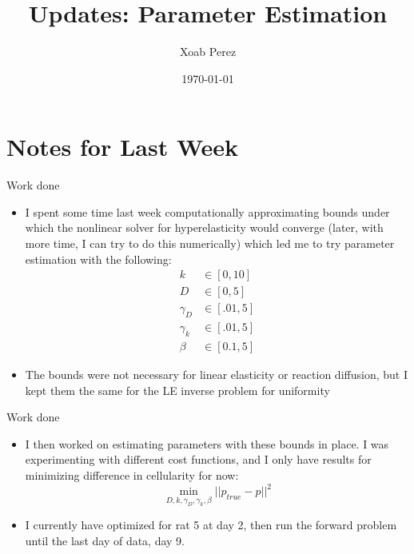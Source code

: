 \documentclass{beamer}
\title[Updates]{Updates: Parameter Estimation}
\author{Xoab Perez}
\date{\today}
\begin{document}
\begin{frame}
  \titlepage
\end{frame}


\section{Notes for Last Week}
\begin{frame}{Work done}
	\begin{minipage}[T][.7\textheight][t]{\textwidth}
		\begin{itemize}
			\item I spent some time last week computationally approximating bounds under which the nonlinear solver for hyperelasticity would converge (later, with more time, I can try to do this numerically) which led me to try parameter estimation with the following:
			\begin{align*}
			 k &\in [0,10] \\
			 D &\in [0,5] \\
			 \gamma_D &\in [.01,5] \\
			 \gamma_k &\in [.01,5] \\
			 \beta &\in [0.1,5] 
			 \end{align*}
			\item The bounds were not necessary for linear elasticity or reaction diffusion, but I kept them the same for the LE inverse problem for uniformity
		\end{itemize}
	\end{minipage}
\end{frame}

\begin{frame}{Work done}
	\begin{minipage}[T][.7\textheight][t]{\textwidth}
		\begin{itemize}
			\item I then worked on estimating parameters with these bounds in place. I was experimenting with different cost functions, and I only have results for minimizing difference in cellularity for now:
			\[ \min_{D,k,\gamma_D,\gamma_k,\beta} ||p_{true}-p||^2 \]
			\item I currently have optimized for rat 5 at day 2, then run the forward problem until the last day of data, day 9. 
		\end{itemize}
	\end{minipage}
\end{frame}
\end{document}
